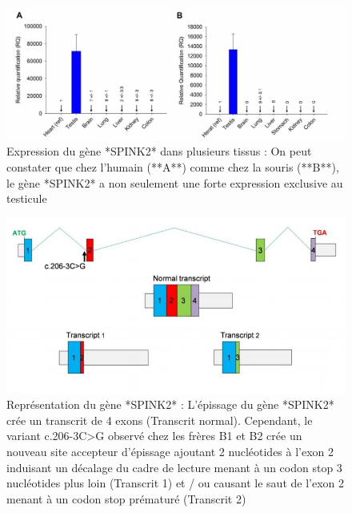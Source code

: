\documentclass[12pt,twoside]{reedthesis}
\theoremstyle{definition}
\theoremstyle{definition}
\theoremstyle{remark}
\begin{document}
  \begin{figure}
  
  {\centering \includegraphics[scale=0.42]{figure/spink2_expression} 
  
  }
  
  \caption[Expression du gène *SPINK2* dans plusieurs tissus]{Expression du gène *SPINK2* dans plusieurs tissus : On peut constater que chez l'humain (**A**) comme chez la souris (**B**), le gène *SPINK2* a non seulement une forte expression exclusive au testicule}\label{fig:spink2exp}
  \end{figure}
  
  \begin{figure}
  
  {\centering \includegraphics[scale=0.42]{figure/spink2_transcripts} 
  
  }
  
  \caption[Représentation du gène *SPINK2*]{Représentation du gène *SPINK2* : L'épissage du gène *SPINK2* crée un transcrit de 4 exons (Transcrit normal). Cependant, le variant c.206-3C>G observé chez les frères B1 et B2 crée un nouveau site accepteur d'épissage ajoutant 2 nucléotides à l'exon 2 induisant un décalage du cadre de lecture menant à un codon stop 3 nucléotides plus loin (Transcrit 1) et / ou causant le saut de l'exon 2 menant à un codon stop prématuré (Transcrit 2)}\label{fig:spink2trans}
  \end{figure}
  
\end{document}
